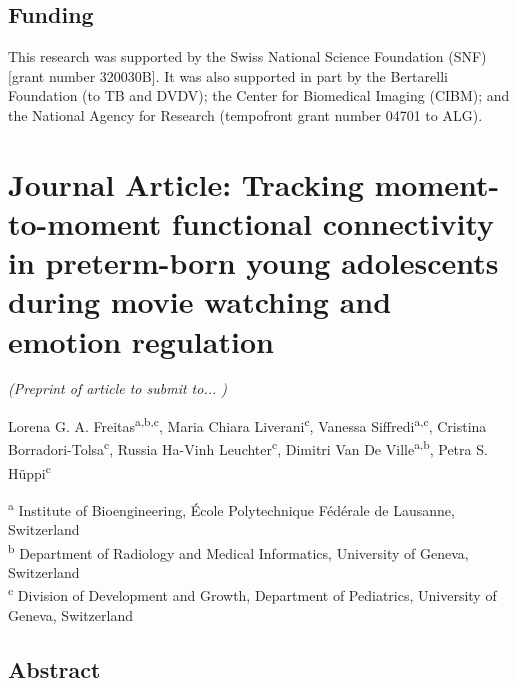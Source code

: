 \subsection*{Funding}
This research was supported by the Swiss National Science Foundation (SNF) [grant number 320030B]. It was also supported in part by the Bertarelli Foundation (to TB and DVDV); the Center for Biomedical Imaging (CIBM); and the National Agency for Research (tempofront grant number 04701 to ALG).




\clearpage

\section{Journal Article: Tracking moment-to-moment functional connectivity in preterm-born young adolescents during movie watching and emotion regulation}\label{section:ppicaps_preterm}

\begin{center}
 \textit{(Preprint of article to submit to... )}
 
Lorena G. A. Freitas\textsuperscript{a,b,c}, 
Maria Chiara Liverani\textsuperscript{c}, 
Vanessa Siffredi\textsuperscript{a,c}, 
Cristina Borradori-Tolsa\textsuperscript{c}, 
Russia Ha-Vinh Leuchter\textsuperscript{c},
Dimitri Van De Ville\textsuperscript{a,b},
Petra S. Hüppi\textsuperscript{c}
\end{center}
\textsuperscript{a} Institute of Bioengineering, École Polytechnique Fédérale de Lausanne, Switzerland \\
\textsuperscript{b} Department of Radiology and Medical Informatics, University of Geneva, Switzerland \\
\textsuperscript{c} Division of Development and Growth, Department of Pediatrics, University of Geneva, Switzerland \\

\subsection*{Abstract}

